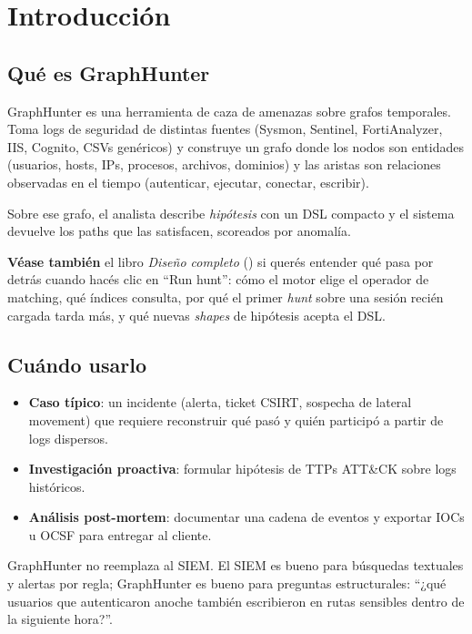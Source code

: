 \chapter{Introducción}
\label{sec:man-intro}

\section{Qué es GraphHunter}

GraphHunter es una herramienta de caza de amenazas sobre grafos
temporales. Toma logs de seguridad de distintas fuentes (Sysmon,
Sentinel, FortiAnalyzer, IIS, Cognito, CSVs genéricos) y construye
un grafo donde los nodos son entidades (usuarios, hosts, IPs,
procesos, archivos, dominios) y las aristas son relaciones
observadas en el tiempo (autenticar, ejecutar, conectar, escribir).

Sobre ese grafo, el analista describe \emph{hipótesis} con un DSL
compacto y el sistema devuelve los paths que las satisfacen,
scoreados por anomalía.

\textbf{Véase también} el libro \emph{Diseño completo}
() si querés entender qué pasa por
detrás cuando hacés clic en ``Run hunt'': cómo el motor elige el
operador de matching, qué índices consulta, por qué el primer
\emph{hunt} sobre una sesión recién cargada tarda más, y qué nuevas
\emph{shapes} de hipótesis acepta el DSL.

\section{Cuándo usarlo}

\begin{itemize}
    \item \textbf{Caso típico}: un incidente (alerta, ticket CSIRT,
    sospecha de lateral movement) que requiere reconstruir qué pasó
    y quién participó a partir de logs dispersos.
    \item \textbf{Investigación proactiva}: formular hipótesis de
    TTPs ATT\&CK sobre logs históricos.
    \item \textbf{Análisis post-mortem}: documentar una cadena de
    eventos y exportar IOCs u OCSF para entregar al cliente.
\end{itemize}

GraphHunter no reemplaza al SIEM. El SIEM es bueno para búsquedas
textuales y alertas por regla; GraphHunter es bueno para
preguntas estructurales: ``¿qué usuarios que autenticaron anoche
también escribieron en rutas sensibles dentro de la siguiente
hora?''.

